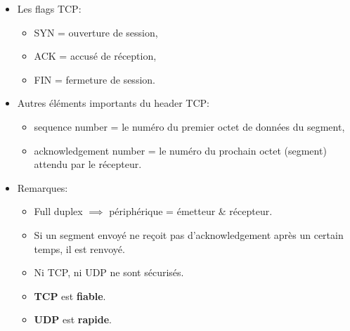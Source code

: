 \documentclass[a4paper]{article}
\begin{document}
\begin{itemize}
\item Les flags TCP:
\begin{itemize}
    \item SYN = ouverture de session,
    \item ACK = accusé de réception,
    \item FIN = fermeture de session.
\end{itemize}





\item Autres éléments importants du header TCP:
\begin{itemize}
    \item sequence number = le numéro du premier octet de données du segment,
    \item acknowledgement number = le numéro du prochain octet (segment) attendu par le récepteur.
\end{itemize}





\item Remarques:
\begin{itemize}
    \item Full duplex $ \implies $ périphérique = émetteur \& récepteur.
    \item Si un segment envoyé ne reçoit pas d'acknowledgement après un certain temps, il est renvoyé.
    \item Ni TCP, ni UDP ne sont sécurisés.
    \item \textbf{TCP} est \textbf{fiable}.
    \item \textbf{UDP} est \textbf{rapide}.
\end{itemize}





\end{itemize}
\end{document}
